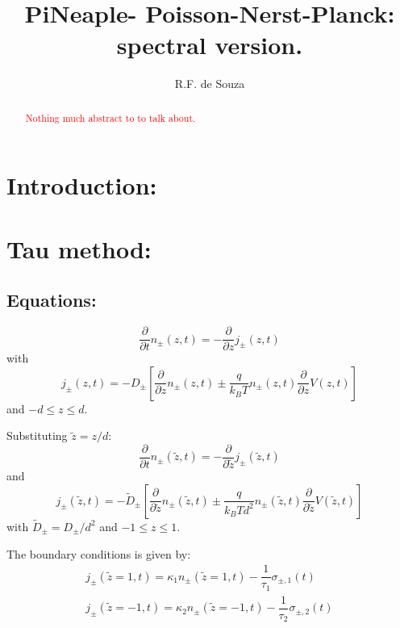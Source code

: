 \documentclass[amsmath,amsfonts,amssymb,superscriptaddress,showkeys,notitlepage,onecolumn]{revtex4-1}
\newcommand{\tred}[1]{ \textcolor{red}{#1} }
\newcommand{\dpartial}[1]{\ensuremath{\dfrac{\partial}{\partial #1}}}
\newcommand{\Npm}{\ensuremath{n_{\pm}(z,t)}}
\newcommand{\jpm}{\ensuremath{j_{\pm}(z,t)}}
\begin{document}
\title{PiNeaple- Poisson-Nerst-Planck: spectral version.}

\author{R.F. de Souza}

\begin{abstract} \tred{ Nothing much abstract to to talk about.} 
\end{abstract}

\maketitle

\section{Introduction:}



\section{Tau method:}

\subsection{Equations:}
\begin{equation}
  \dfrac{\partial}{\partial t}\Npm= -\dpartial{z} \jpm
\end{equation}
with
\begin{equation}\label{eq:StrongFlux}
  j_{\pm}(z,t)=-D_{\pm}\left[\dpartial{z} \Npm \pm \dfrac{q}{k_B T} \Npm \dpartial{z} V(z,t) \right] 
\end{equation}
and $-d \leq z \leq d$.

  \renewcommand{\Npm}{\ensuremath{n_{\pm}(\tilde{z},t)}}
  \renewcommand{\jpm}{\ensuremath{j_{\pm}(\tilde{z},t)}}

  
  Substituting $\tilde{z}=z/d$:
  \begin{equation}\label{eq:StrongPotential}
  \dfrac{\partial}{\partial t}\Npm= -\dpartial{\tilde{z}} \jpm
\end{equation}
and  
\begin{equation}
  \jpm=-\tilde{D}_\pm\left[\dpartial{\tilde{z}}\Npm \pm \dfrac{q}{k_B T d^2} \Npm \dpartial{\tilde{z}} V(\tilde{z},t) \right]
\end{equation}
with $\tilde{D}_\pm =D_\pm/d^2$ and $-1\leq z \leq 1$.

The boundary conditions is given by:
\begin{align}\nonumber
  j_{\pm}(\tilde{z}=1,t)=\kappa_1 n_{\pm}(\tilde{z}=1,t) -\dfrac{1}{\tau_1}\sigma_{\pm,1}(t)\\
  j_{\pm}(\tilde{z}=-1,t)=\kappa_2 n_{\pm}(\tilde{z}=-1,t) -\dfrac{1}{\tau_2}\sigma_{\pm,2}(t)
\end{align}
\end{document}
